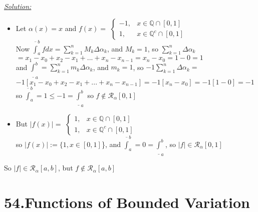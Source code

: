 \documentclass{article}
\begin{document}
\begin{tcolorbox}[enhanced,attach boxed title to top center={yshift=-3mm,yshifttext=-1mm},  colback=blue!5!white,colframe=blue!75!black,colbacktitle=red!80!black,
  title=Exercise 18:.,fonttitle=\bfseries,
  boxed title style={size=small,colframe=red!50!black} ]
  \textit{\underline {\color{blue}Solution:}}
\begin{itemize}
    \item Let $\alpha(x)=x$ and $f(x)=$
    $\begin{cases}
     -1,& x\in\mathbb{Q}\cap[0,1]\\
      1,& x\in\mathbb{Q}^c\cap[0,1]
    \end{cases}$\\
    Now $\overline{\int}_a^b f dx=\sum_{k=1}^n M_k\Delta\alpha_k$, and $M_k=1$, so $\sum_{k=1}^n\Delta\alpha_k$\\
    $=x_1-x_0+x_2-x_1+...+x_n-x_{n-1}=x_n-x_0=1-0=1$\\
    and $\underline{\int}_a^b=\sum_{k=1}^n m_k\Delta\alpha_k$, and $m_k=1$, so
    $-1\sum_{k=1}^n\Delta\alpha_k=$\\
    $-1[x_1-x_0+x_2-x_1+...+x_n-x_{n-1}]=-1[x_n-x_0]=-1[1-0]=-1$\\
    so $\overline{\int}_a^b=1\leq -1=\underline{\int}_a^b$ so $f\notin\mathscr{R}_\alpha[0,1]$
    \item But $|f(x)|=$
     $\begin{cases}
      1, & x\in\mathbb{Q}\cap[0,1]\\
      1,& x\in\mathbb{Q}^c\cap[0,1]
    \end{cases}$\\
    so $|f(x)|:=\{1, x\in[0,1]$\}, and $\overline{\int}_a^b=0=\underline{\int}_a^b$, so $|f|\in\mathscr{R}_\alpha[0,1]$
\end{itemize} 
\begin{tcolorbox}[colback=blue!5!white,colframe=blue!75!black]
\begin{center}
     So $|f|\in\mathscr{R}_\alpha[a,b]$, but $f\notin\mathscr{R}_\alpha[a,b]$
\end{center}
 
\end{tcolorbox}
\end{tcolorbox}

\section*{54.Functions of Bounded Variation}
\end{document}
